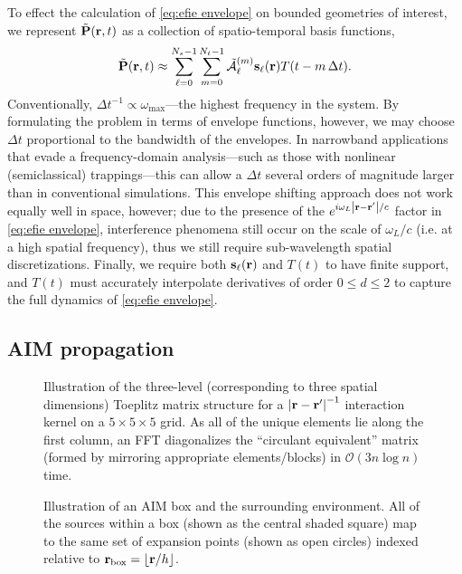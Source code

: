 To effect the calculation of \cref{eq:efie envelope} on bounded geometries of interest, we represent $\tilde{\vb{P}}(\vb{r}, t)$ as a collection of spatio-temporal basis functions,
\begin{equation}
  \tilde{\vb{P}}(\vb{r}, t) \approx \sum_{\ell = 0}^{N_s - 1} \sum_{m = 0}^{N_t - 1} \tilde{\mathcal{A}}_\ell^{(m)} \vb{s}_\ell(\vb{r}) T(t - m \, \Delta t).
  \label{eq:discretization}
\end{equation}
Conventionally, $\Delta t^{-1} \propto \omega_\text{max}$---the highest frequency in the system.
By formulating the problem in terms of envelope functions, however, we may choose $\Delta t$ proportional to the bandwidth of the envelopes.
In narrowband applications that evade a frequency-domain analysis---such as those with nonlinear (semiclassical) trappings---this can allow a $\Delta t$ several orders of magnitude larger than in conventional simulations.
This envelope shifting approach does not work equally well in space, however; due to the presence of the $e^{i \omega_L \abs{\vb{r} - \vb{r}'}/c}$ factor in \cref{eq:efie envelope}, interference phenomena still occur on the scale of $\omega_L/c$ (i.e. at a high spatial frequency), thus we still require sub-wavelength spatial discretizations.
Finally, we require both $\vb{s}_\ell(\vb{r})$ and $T(t)$ to have finite support, and $T(t)$ must accurately interpolate derivatives of order $0 \leqslant d \leqslant 2$ to capture the full dynamics of \cref{eq:efie envelope}.

\subsection{AIM propagation}

\begin{figure}
  \centering
  \caption{\label{fig:toeplitz}Illustration of the three-level (corresponding to three spatial dimensions) Toeplitz matrix structure for a $\abs{\vb{r} - \vb{r}'}^{-1}$ interaction kernel on a $5 \times 5 \times 5$ grid.
  As all of the unique elements lie along the first column, an FFT diagonalizes the ``circulant equivalent'' matrix (formed by mirroring appropriate elements/blocks) in $\mathcal{O}(3 n \log n)$ time.}
\end{figure}


\begin{figure}
  \centering
  
  \caption{\label{fig:aim terminology} Illustration of an AIM box and the surrounding environment.
    All of the sources within a box (shown as the central shaded square) map to the same set of expansion points (shown as open circles) indexed relative to $\vb{r}_\text{box} = \lfloor\vb{r}/h\rfloor$.
  }
\end{figure}

